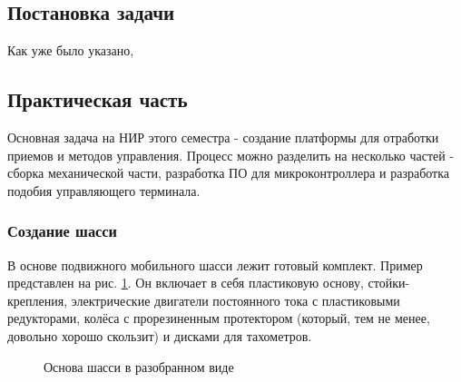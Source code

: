 \documentclass[14pt,a4paper,russian]{scrartcl}
\begin{document}
\subsection{Постановка задачи}
Как уже было указано, 
\newpage

\subsection{Практическая часть}
Основная задача на НИР этого семестра - создание платформы для отработки
приемов и методов управления. Процесс можно разделить на
несколько частей - сборка механической части, разработка ПО для микроконтроллера и 
разработка подобия управляющего терминала.

\subsubsection{Создание шасси}
В основе подвижного мобильного шасси лежит готовый комплект. Пример
представлен на рис. \ref{fig:shassis_dissassembled}. Он включает в себя пластиковую основу,
стойки-крепления, электрические двигатели постоянного тока с пластиковыми редукторами,
колёса с прорезиненным протектором (который, тем не менее, довольно хорошо скользит)
и дисками для тахометров.
\begin{figure}[h]
    \caption{Основа шасси в разобранном виде}
    \label{fig:shassis_dissassembled}
\end{figure}
\end{document}
